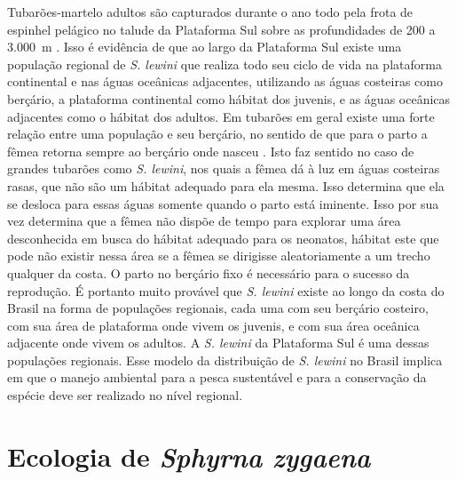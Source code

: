\documentclass[a4paper,11pt,twoside,showtrims,onecolumn,openright,final]{memoir}
\begin{document}
Tubarões-martelo adultos são capturados durante o ano todo pela frota de espinhel pelágico 
no talude da Plataforma Sul sobre as profundidades de 200 a 3.000~m \citep[Capítulo~\ref{chap:pesca-industrial}]{kotas2004}. %
Isso é evidência de que ao largo da Plataforma Sul existe uma população regional de \emph{S. lewini}
que realiza todo seu ciclo de vida na plataforma continental e nas águas oceânicas adjacentes, 
utilizando as águas costeiras como berçário, a plataforma continental como hábitat dos juvenis, 
e as águas oceânicas adjacentes como o hábitat dos adultos. Em tubarões em geral existe uma forte 
relação entre uma população e seu berçário, no sentido de que para o parto a fêmea retorna sempre 
ao berçário onde nasceu \citep{camhi1998}. %
Isto faz sentido no caso de grandes tubarões como \emph{S. lewini}, 
nos quais a fêmea dá à luz em águas costeiras rasas, que não são um hábitat adequado para ela mesma. 
Isso determina que ela se desloca para essas águas somente quando o parto está iminente. Isso por sua 
vez determina que a fêmea não dispõe de tempo para explorar uma área desconhecida em busca do hábitat 
adequado para os neonatos, hábitat este que pode não existir nessa área se a fêmea se dirigisse 
aleatoriamente a um trecho qualquer da costa. O parto no berçário fixo é necessário para o sucesso da 
reprodução. É portanto muito provável que \emph{S. lewini} existe ao longo da costa do Brasil na forma de 
populações regionais, cada uma com seu berçário costeiro, com sua área de plataforma onde vivem os juvenis,  
e com sua área oceânica adjacente onde vivem os adultos. A \emph{S. lewini} da Plataforma Sul é uma dessas 
populações regionais.  Esse modelo da distribuição de \emph{S. lewini} no Brasil implica em que o manejo 
ambiental para a pesca sustentável e para a conservação da espécie deve ser realizado no nível regional.

\section*{Ecologia de \emph{Sphyrna zygaena}}
\end{document}
